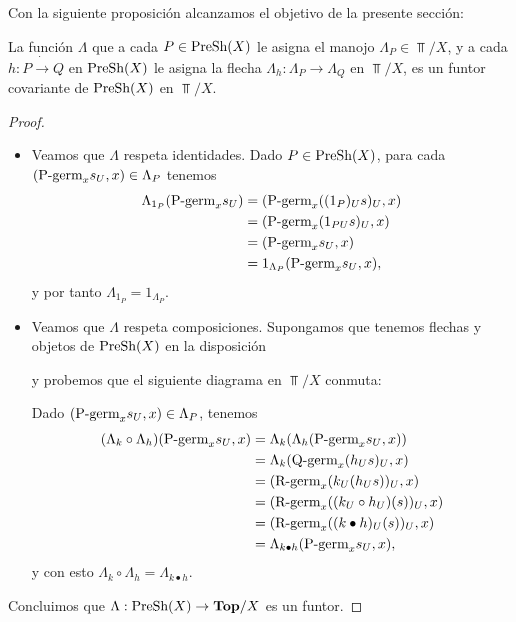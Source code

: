 Con la siguiente proposición alcanzamos el objetivo de la presente sección:
\begin{Prop}
   La función $\Lambda$ que a cada $P\in \normalfont{\text{PreSh}}(X)$ le asigna el manojo $\Lambda_P\in\Top/X$, y a cada $h:P\dot{\to}Q$ en $\normalfont{\text{PreSh}}(X)$ le asigna la flecha $\Lambda_h:\Lambda_P\to \Lambda_Q$ en $\Top/X$, es un funtor covariante de $\normalfont{\text{PreSh}}(X)$ en $\Top/X$.   
\end{Prop}
\begin{proof}
   \begin{itemize}
      \item Veamos que $\Lambda$ respeta identidades. Dado $P\in\normalfont{\text{PreSh}}(X)$, para cada $(\normalfont{\text{P-germ}}_{x}s_{U},x)\in\Lambda_P$ tenemos
         $$
         \begin{aligned}
            \Lambda_{1_{P}}(\normalfont{\text{P-germ}}_{x}s_{U})&=(\normalfont{\text{P-germ}}_{x}({(1_{P})_{U}s})_{U},x)\\
                                            &=(\normalfont{\text{P-germ}}_{x}(1_{PU}s)_{U},x)\\
                                            &=(\normalfont{\text{P-germ}}_{x}s_{U},x)\\
                                            &=1_{\Lambda_P}(\normalfont{\text{P-germ}}_{x}s_{U},x),
         \end{aligned}
         $$
         y por tanto $\Lambda_{1_{P}}=1_{\Lambda_P}$.
      \item Veamos que $\Lambda$ respeta composiciones. Supongamos que tenemos flechas y objetos de $\normalfont{\text{PreSh}}(X)$ en la disposición
         
         y probemos que el siguiente diagrama en $\Top/X$ conmuta:
         
         Dado $(\normalfont{\text{P-germ}}_{x}s_{U},x)\in\Lambda_P$, tenemos
         $$
         \begin{aligned}
            (\Lambda_{k}\circ \Lambda_{h})(\normalfont{\text{P-germ}}_{x}s_{U},x)&=\Lambda_{k}(\Lambda_{h}(\normalfont{\text{P-germ}}_{x}s_{U},x))\\
                                                             &=\Lambda_{k}(\normalfont{\text{Q-germ}}_{x}(h_{U}s)_{U},x)\\
                                                             &=(\normalfont{\text{R-germ}}_{x}(k_{U}(h_{U}s))_{U},x)\\
                                                             &=(\normalfont{\text{R-germ}}_{x}((k_{U}\circ h_{U})(s))_{U},x)\\
                                                             &=(\normalfont{\text{R-germ}}_{x}((k\bullet h)_{U}(s))_{U},x)\\
                                                             &=\Lambda_{k\bullet h}(\normalfont{\text{P-germ}}_{x}s_{U},x),
         \end{aligned}
         $$
         y con esto $\Lambda_{k}\circ\Lambda_{h}=\Lambda_{k\bullet h}$.
   \end{itemize}
   Concluimos que $\Lambda:\normalfont{\text{PreSh}}(X)\to\normalfont{\textbf{Top}}/X$ es un funtor.
\end{proof}
